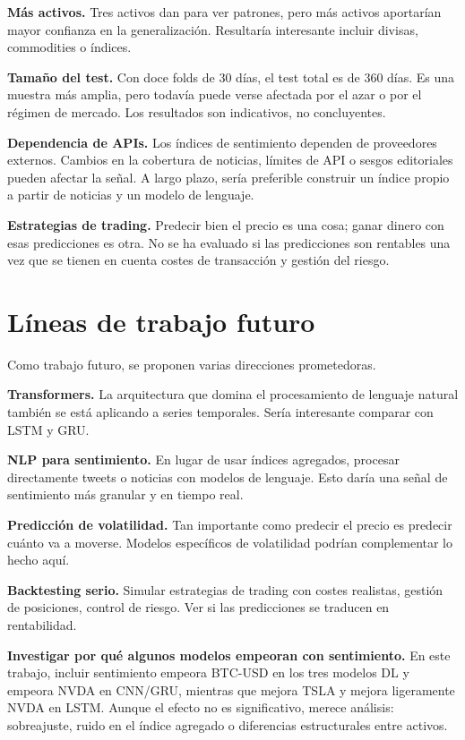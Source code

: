 \textbf{Más activos.} Tres activos dan para ver patrones, pero más activos aportarían mayor confianza en la generalización. Resultaría interesante incluir divisas, commodities o índices.

\textbf{Tamaño del test.} Con doce folds de 30 días, el test total es de 360 días. Es una muestra más amplia, pero todavía puede verse afectada por el azar o por el régimen de mercado. Los resultados son indicativos, no concluyentes.

\textbf{Dependencia de APIs.} Los índices de sentimiento dependen de proveedores externos. Cambios en la cobertura de noticias, límites de API o sesgos editoriales pueden afectar la señal. A largo plazo, sería preferible construir un índice propio a partir de noticias y un modelo de lenguaje.

\textbf{Estrategias de trading.} Predecir bien el precio es una cosa; ganar dinero con esas predicciones es otra. No se ha evaluado si las predicciones son rentables una vez que se tienen en cuenta costes de transacción y gestión del riesgo.

\section{Líneas de trabajo futuro}

Como trabajo futuro, se proponen varias direcciones prometedoras.

\textbf{Transformers.} La arquitectura que domina el procesamiento de lenguaje natural también se está aplicando a series temporales. Sería interesante comparar con LSTM y GRU.

\textbf{NLP para sentimiento.} En lugar de usar índices agregados, procesar directamente tweets o noticias con modelos de lenguaje. Esto daría una señal de sentimiento más granular y en tiempo real.

\textbf{Predicción de volatilidad.} Tan importante como predecir el precio es predecir cuánto va a moverse. Modelos específicos de volatilidad podrían complementar lo hecho aquí.

\textbf{Backtesting serio.} Simular estrategias de trading con costes realistas, gestión de posiciones, control de riesgo. Ver si las predicciones se traducen en rentabilidad.

\textbf{Investigar por qué algunos modelos empeoran con sentimiento.} En este trabajo, incluir sentimiento empeora BTC-USD en los tres modelos DL y empeora NVDA en CNN/GRU, mientras que mejora TSLA y mejora ligeramente NVDA en LSTM. Aunque el efecto no es significativo, merece análisis: sobreajuste, ruido en el índice agregado o diferencias estructurales entre activos.

